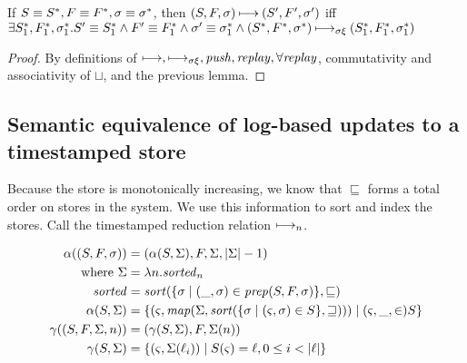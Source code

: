 \documentclass{llncs}
\begin{document}
\begin{theorem}
If $S \equiv S^*, F \equiv F^*, \sigma \equiv \sigma^*$, then
$(S,F,\sigma) \mathbin{\longmapsto} (S',F',\sigma')$ iff
$\exists S^*_1, F^*_1, \sigma^*_1.
  S' \equiv S^*_1 \wedge F' \equiv F^*_1 \wedge \sigma' \equiv \sigma^*_1 \wedge
  (S^*,F^*,\sigma^*) \mathbin{\longmapsto_{\mathit{\sigma\xi}}} (S^*_1,F^*_1,\sigma^*_1)$
\end{theorem}
\begin{proof}
By definitions of $\mathbin{\longmapsto}, \mathbin{\longmapsto_{\mathit{\sigma\xi}}}, \mathit{push}, \mathit{replay},
\forall\mathit{replay}$, commutativity and associativity of $\sqcup$, and the previous lemma.
\end{proof}

\subsection{Semantic equivalence of log-based updates to a timestamped store}

Because the store is monotonically increasing, we know that
$\sqsubseteq$ forms a total order on stores in the system. We use this
information to sort and index the stores. Call the timestamped reduction relation $\mathbin{\longmapsto_n}$.

\begin{align*}
\alpha((S,F,\sigma)) &= (\alpha(S,\Sigma), F, \Sigma, |\Sigma|-1) \\
\text{ where } \Sigma &= \lambda n. \mathit{sorted}_n \\
               \mathit{sorted} &= \mathit{sort}(\{\sigma \mid (\_, \sigma) \in \mathit{prep}(S,F,\sigma)\},\sqsubseteq) \\
\alpha(S,\Sigma) &=
   \{(\varsigma, \mathit{map}(\Sigma,\mathit{sort}(\{\sigma \mid (\varsigma, \sigma) \in S\}, \sqsupseteq)))
           \mid (\varsigma,\_, \in) S\} \\
\gamma((S,F,\Sigma,n)) &= (\gamma(S,\Sigma), F, \Sigma(n)) \\
\gamma(S,\Sigma) &= \{(\varsigma, \Sigma(\ell_i)) \mid S(\varsigma) = \ell, 0 \le i < |\ell|\}
\end{align*}


\end{document}
